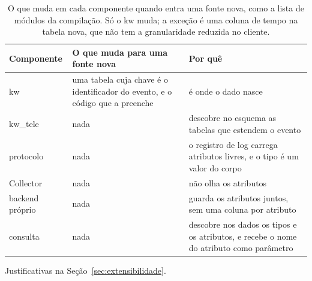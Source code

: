 \begin{table}[!ht]
  \centering
  \footnotesize
  \setlength{\tabcolsep}{4pt}
  \begin{threeparttable}
    \caption{O que muda em cada componente quando entra uma fonte nova, como a
      lista de módulos da compilação. Só o kw muda; a exceção é uma coluna de tempo na tabela nova, que não tem
      a granularidade reduzida no cliente.}
    \label{tab:extensao}
    \begin{tabular}{@{}>{\raggedright\arraybackslash}p{2.4cm}
                      >{\raggedright\arraybackslash}p{4.6cm}
                      >{\raggedright\arraybackslash}p{7.2cm}@{}}
      \toprule
      Componente & O que muda para uma fonte nova & Por quê \\
      \midrule
      kw & uma tabela cuja chave é o identificador do evento, e o código que a preenche
         & é onde o dado nasce \\
      \addlinespace[2pt]
      kw\_tele & nada
         & descobre no esquema as tabelas que estendem o evento \\
      \addlinespace[2pt]
      protocolo & nada
         & o registro de log carrega atributos livres, e o tipo é um valor do corpo \\
      \addlinespace[2pt]
      Collector & nada
         & não olha os atributos \\
      \addlinespace[2pt]
      backend próprio & nada
         & guarda os atributos juntos, sem uma coluna por atributo \\
      \addlinespace[2pt]
      consulta & nada
         & descobre nos dados os tipos e os atributos, e recebe o nome do
           atributo como parâmetro \\
      \bottomrule
    \end{tabular}
    \begin{tablenotes}
      \footnotesize
      \item Justificativas na Seção~\ref{sec:extensibilidade}.
    \end{tablenotes}
  \end{threeparttable}
\end{table}
